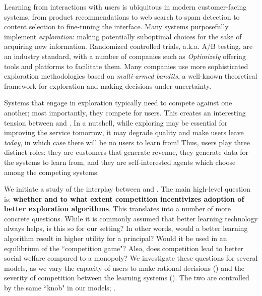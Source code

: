 Learning from interactions with users is ubiquitous in modern customer-facing systems, from product recommendations to web search to spam detection to content selection to fine-tuning the interface. Many systems purposefully implement \emph{exploration}: making potentially suboptimal choices for the sake of acquiring new information. Randomized controlled trials, a.k.a. A/B testing, are an industry standard, with a number of companies such as \emph{Optimizely} offering tools and platforms to facilitate them. Many companies use more sophisticated exploration methodologies based on \emph{multi-armed bandits}, a well-known theoretical framework for exploration and making decisions under uncertainty.


Systems that engage in exploration typically need to compete against one another; most importantly, they compete for users. This creates an interesting tension between \exploration and \competition. In a nutshell, while exploring may be essential for improving the service tomorrow, it may degrade quality and make users leave \emph{today}, in which case there will be no users to learn from! Thus, users play three distinct roles: they are customers that generate revenue, they generate data for the systems to learn from, and they are self-interested agents which choose among the competing systems.


We initiate a study of the interplay between \exploration and \competition. The main high-level question is: {\bf whether and to what extent competition incentivizes adoption of better exploration algorithms}. This translates into a number of more concrete questions. While it is commonly assumed that better learning technology always helps, is this so for our setting? In other words, would a better learning algorithm result in higher utility for a principal? Would it be used in an equilibrium of the ``competition game"? Also, does competition lead to better social welfare compared to a monopoly? We investigate these questions for several models, as we vary the capacity of users to make rational decisions (\rationality ) and the severity of competition between the learning systems (\competitiveness). The two are controlled by the same ``knob" in our models; .


